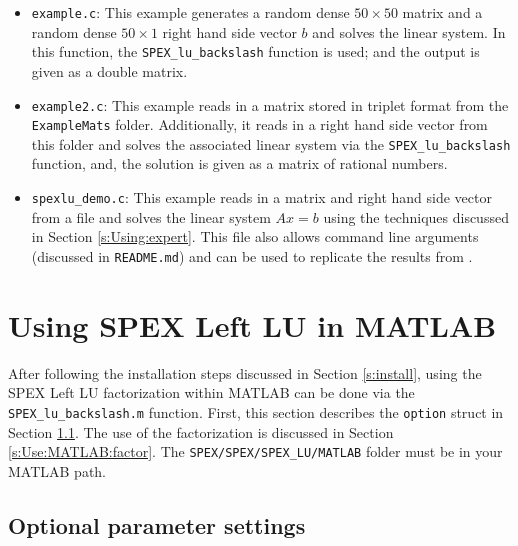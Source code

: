 \documentclass[12pt]{report}
\theoremstyle{definition}
\begin{document}
\begin{itemize}
\item \verb|example.c|: This example generates a random dense $50 \times 50$
matrix and a random dense $50 \times 1$ right hand side vector $b$ and
solves the linear system. In this function, the \verb|SPEX_lu_backslash|
function is used; and the output is given as a double matrix.

\item \verb|example2.c|: This example reads in a matrix stored in triplet
format from the \verb|ExampleMats| folder. Additionally, it reads in a
right hand side vector from this folder and solves the associated linear system
via the \verb|SPEX_lu_backslash| function, and, the solution is given as a matrix
of rational numbers.

\item \verb|spexlu_demo.c|: This example reads in a matrix and right hand side
vector from a file and solves the linear system $A x = b$
using the techniques discussed in Section \ref{s:Using:expert}. This file also
allows command line arguments (discussed in \verb|README.md|) and can be used
to replicate the results from \cite{lourenco2019exact}.

\end{itemize}

\cprotect\section{Using SPEX Left LU in MATLAB}
\label{s:Use:MATLAB}

After following the installation steps discussed in Section \ref{s:install},
using the SPEX Left LU factorization within MATLAB can be done via the
\verb|SPEX_lu_backslash.m| function. First, this section describes the
\verb|option| struct in Section \ref{s:Use:MATLAB:setup}.
The use of the factorization is discussed in Section \ref{s:Use:MATLAB:factor}.
The \verb|SPEX/SPEX/SPEX_LU/MATLAB| folder must be in your MATLAB path.

\cprotect\subsection{Optional parameter settings}
\label{s:Use:MATLAB:setup}
\end{document}
